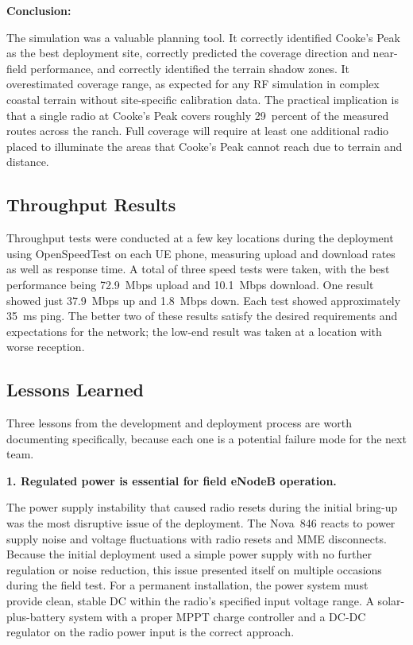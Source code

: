 \documentclass[
    left=1.5in,
    right=1.25in,
    top=1.25in,
    bottom=1.25in
]{CalPolySeniorProject}
\begin{document}
\textbf{Conclusion:}

The simulation was a valuable planning tool. It correctly identified Cooke's
Peak as the best deployment site, correctly predicted the coverage direction and
near-field performance, and correctly identified the terrain shadow zones. It
overestimated coverage range, as expected for any RF simulation in complex
coastal terrain without site-specific calibration data. The practical implication
is that a single radio at Cooke's Peak covers roughly 29~percent of the measured
routes across the ranch. Full coverage will require at least one additional radio
placed to illuminate the areas that Cooke's Peak cannot reach due to terrain and
distance.

\subsection{Throughput Results}

Throughput tests were conducted at a few key locations during the deployment
using OpenSpeedTest on each UE phone, measuring upload and download rates as
well as response time. A total of three speed tests were taken, with the best
performance being 72.9~Mbps upload and 10.1~Mbps download. One result showed
just 37.9~Mbps up and 1.8~Mbps down. Each test showed approximately 35~ms
ping. The better two of these results satisfy the desired requirements and
expectations for the network; the low-end result was taken at a location with
worse reception.

\subsection{Lessons Learned}

Three lessons from the development and deployment process are worth documenting
specifically, because each one is a potential failure mode for the next team.

\textbf{1. Regulated power is essential for field eNodeB operation.}

The power supply instability that caused radio resets during the initial bring-up
was the most disruptive issue of the deployment. The Nova~846 reacts to power
supply noise and voltage fluctuations with radio resets and MME disconnects.
Because the initial deployment used a simple power supply with no further
regulation or noise reduction, this issue presented itself on multiple occasions
during the field test. For a permanent installation, the power system must
provide clean, stable DC within the radio's specified input voltage range. A solar-plus-battery system with a
proper MPPT charge controller and a DC-DC regulator on the radio power input is
the correct approach.
\end{document}

